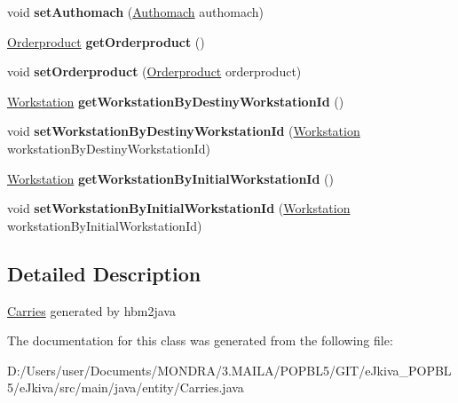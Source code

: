 \begin{DoxyCompactItemize}
\mbox{\label{classentity_1_1_carries_a5fddad71e78d3206116e710916c8bb74}} 
void {\bfseries set\+Authomach} (\mbox{\hyperlink{classentity_1_1_authomach}{Authomach}} authomach)
\item 
\mbox{\label{classentity_1_1_carries_a6439c3d458849f3f5d87c0f9577fc16b}} 
\mbox{\hyperlink{classentity_1_1_orderproduct}{Orderproduct}} {\bfseries get\+Orderproduct} ()
\item 
\mbox{\label{classentity_1_1_carries_af3856ed5dc8866063ed552e5a6289736}} 
void {\bfseries set\+Orderproduct} (\mbox{\hyperlink{classentity_1_1_orderproduct}{Orderproduct}} orderproduct)
\item 
\mbox{\label{classentity_1_1_carries_a13e9ee65fee8f33abd1b5fcd4da046c2}} 
\mbox{\hyperlink{classentity_1_1_workstation}{Workstation}} {\bfseries get\+Workstation\+By\+Destiny\+Workstation\+Id} ()
\item 
\mbox{\label{classentity_1_1_carries_a97c1c2cb313a25a61f86e538345ae58f}} 
void {\bfseries set\+Workstation\+By\+Destiny\+Workstation\+Id} (\mbox{\hyperlink{classentity_1_1_workstation}{Workstation}} workstation\+By\+Destiny\+Workstation\+Id)
\item 
\mbox{\label{classentity_1_1_carries_a4d75d589a3902ef133f3be58d725b852}} 
\mbox{\hyperlink{classentity_1_1_workstation}{Workstation}} {\bfseries get\+Workstation\+By\+Initial\+Workstation\+Id} ()
\item 
\mbox{\label{classentity_1_1_carries_a807fe564289f14063a30047d3cea3522}} 
void {\bfseries set\+Workstation\+By\+Initial\+Workstation\+Id} (\mbox{\hyperlink{classentity_1_1_workstation}{Workstation}} workstation\+By\+Initial\+Workstation\+Id)
\end{DoxyCompactItemize}


\subsection{Detailed Description}
\mbox{\hyperlink{classentity_1_1_carries}{Carries}} generated by hbm2java 

The documentation for this class was generated from the following file\+:\begin{DoxyCompactItemize}
\item 
D\+:/\+Users/user/\+Documents/\+M\+O\+N\+D\+R\+A/3.\+M\+A\+I\+L\+A/\+P\+O\+P\+B\+L5/\+G\+I\+T/e\+Jkiva\+\_\+\+P\+O\+P\+B\+L5/e\+Jkiva/src/main/java/entity/Carries.\+java\end{DoxyCompactItemize}
